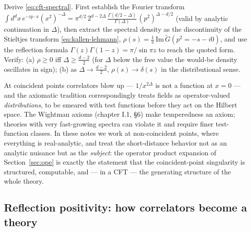 \begin{exercise}[classic]
\label{exr:cft-spectral}
Derive \eqref{eq:cft-spectral}. First establish the Fourier transform
$\int d^dx \, e^{-ip\cdot x} (x^2)^{-\Delta} = \pi^{d/2}\, 2^{d - 2\Delta}\,
\frac{\Gamma(d/2 - \Delta)}{\Gamma(\Delta)}\, (p^2)^{\Delta - d/2}$ (valid by
analytic continuation in $\Delta$), then extract the spectral density as the
discontinuity of the Stieltjes transform \eqref{eq:kallen-lehmann}, $\rho(s) =
\frac{1}{\pi}\,\mathrm{Im}\,\tilde G(p^2 = -s - i0)$, and use the reflection
formula $\Gamma(z)\Gamma(1-z) = \pi/\sin \pi z$ to reach the quoted form.
Verify: (a) $\rho \ge 0$ iff $\Delta \ge \frac{d-2}{2}$ (for $\Delta$ below the
free value the would-be density oscillates in sign); (b) as $\Delta \to
\frac{d-2}{2}$, $\rho(s) \to \delta(s)$ in the distributional sense.
\end{exercise}

\begin{reemark}
\label{rem:distributions}
At coincident points correlators blow up --- $1/x^{2\Delta}$ is not a function
at $x = 0$ --- and the axiomatic tradition correspondingly treats fields as
operator-valued \emph{distributions}, to be smeared with test functions before
they act on the Hilbert space. The Wightman axioms (chapter I.1, \S6) make
temperedness an axiom; theories with very fast-growing spectra can violate it
and require finer test-function classes. In these notes we work at non-coincident
points, where everything is real-analytic, and treat the short-distance
behavior not as an analytic nuisance but as the \emph{subject}: the operator
product expansion of Section~\ref{sec:ope} is exactly the statement that the
coincident-point singularity is structured, computable, and --- in a CFT ---
the generating structure of the whole theory.
\end{reemark}

\subsection{Reflection positivity: how correlators become a theory}
\label{sec:reflection-positivity}

